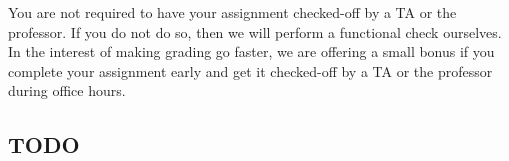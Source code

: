 You are not required to have your assignment checked-off by a TA or the professor.
If you do not do so, then we will perform a functional check ourselves.
In the interest of making grading go faster, we are offering a small bonus %
if you complete your assignment early and get it checked-off by a TA or the professor during office hours.

\subsection*{TODO}

%
%
